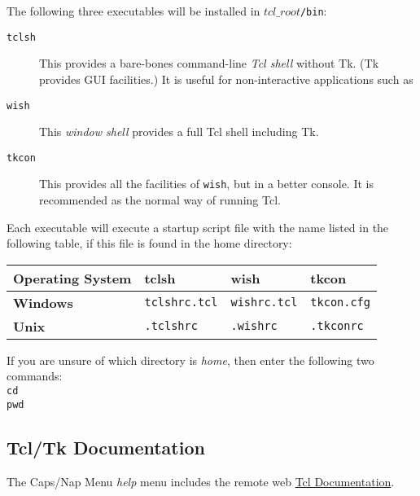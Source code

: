  The following three executables will be installed in 
  $tcl\_root$\texttt{/bin}:
  \begin{description}
    \item[\texttt{tclsh}]
    This provides a bare-bones command-line 
    \emph{Tcl shell} without Tk. (Tk provides GUI facilities.) It is
    useful for non-interactive applications such as 
    \item[\texttt{wish}]
    This 
    \emph{window shell} provides a full Tcl shell including Tk.
    \item[\texttt{tkcon}]
    This provides all the facilities of 
    \texttt{wish}, but in a better console. It is recommended as
    the normal way of running Tcl.
  \end{description}
  
 Each executable will execute a startup script file with the name
  listed in the following table, if this file is found in the home
  directory:

\begin{tabular}{|l||l|l|l|}
    \hline 
      \textbf{Operating System} & 
      \textbf{tclsh} & 
      \textbf{wish} & 
      \textbf{tkcon}
    \\
    \hline 
    \hline 
        \textbf{Windows}
       & 
        \texttt{tclshrc.tcl}
       & 
        \texttt{wishrc.tcl}
       & 
        \texttt{tkcon.cfg}
    \\
    \hline 
        \textbf{Unix}
       & 
        \texttt{.tclshrc}
       & 
        \texttt{.wishrc}
       & 
        \texttt{.tkconrc}
    \\
  \hline
\end{tabular}
  
 If you are unsure of which directory is 
  \emph{home}, then enter the following two commands: 
  \texttt{
  \\cd
  \\pwd}

\subsection{Tcl/Tk Documentation}
    \label{install-tcl-doc}

The Caps/Nap Menu
  \emph{help} menu includes the remote web 
  \href{http://aspn.activestate.com/ASPN/Tcl/Reference/}{Tcl Documentation}.

